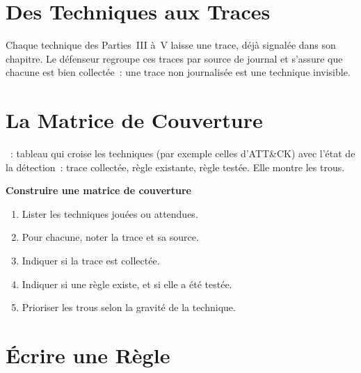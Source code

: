 \section{Des Techniques aux Traces}
\label{sec:c21-traces}

Chaque technique des Parties~III à~V laisse une trace, déjà signalée dans
son chapitre. Le défenseur regroupe ces traces par source de journal et
s'assure que chacune est bien collectée~: une trace non journalisée est une
technique invisible.

\section{La Matrice de Couverture}
\label{sec:c21-matrice}

\begin{boxdef}
~: tableau qui croise les
techniques (par exemple celles d'ATT\&CK) avec l'état de la détection~: trace
collectée, règle existante, règle testée. Elle montre les trous.
\end{boxdef}

\begin{boxprocedure}
\textbf{Construire une matrice de couverture}
\begin{enumerate}
    \item Lister les techniques jouées ou attendues.
    \item Pour chacune, noter la trace et sa source.
    \item Indiquer si la trace est collectée.
    \item Indiquer si une règle existe, et si elle a été testée.
    \item Prioriser les trous selon la gravité de la technique.
\end{enumerate}
\end{boxprocedure}

\section{Écrire une Règle}
\label{sec:c21-regle}

